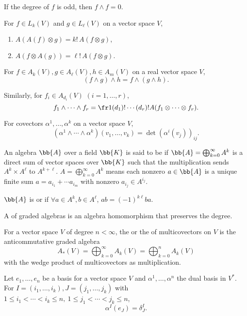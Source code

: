 If the degree of $f$ is odd, then $f \wedge f = 0$.

For $f \in L_k(V)$ and $g \in L_\ell(V)$ on a vector space $V$,
\begin{enumerate}
\item $A(A(f)\otimes g) = k!\,A(f\otimes g)$,
\item $A(f\otimes A(g)) = \ell!\,A(f\otimes g)$.
\end{enumerate}

For $f \in A_k(V), g \in A_\ell(V), h \in A_m(V)$ on a real vector space $V$,
\[
(f \wedge g) \wedge h = f \wedge ( g \wedge h).
\]

Similarly, for $f_i \in A_{d_i}(V)$ $(i = 1, \dotsc, r)$,
\[
f_1 \wedge \dotsb \wedge f_r = \fr1{(d_1)!\dotsm (d_r)!} A(f_1 \otimes \dotsm \otimes f_r).
\]

For covectors $\alpha^1, \dotsc , \alpha^k$ on a vector space $V$,
\[
(\alpha^1\wedge \dotsm \wedge \alpha^k)(v_1,\dotsc, v_k) = \det (\alpha^i (v_j))_{ij}.
\]

An algebra $\bb{A}$ over a field $\bb{K}$ is said to be  if $\bb{A} = \bigoplus_{k = 0}^\infty A^k$ is a direct sum of vector spaces over $\bb{K}$ such that the multiplication sends $A^k \times A^\ell$ to $A^{k+\ell}$. $A = \bigoplus_{k = 0}^\infty A^k$ means each nonzero $a \in \bb{A}$ is a unique finite sum $a = a_{i_1} + \dotsb a_{i_m}$ with nonzero $a_{i_j} \in A^{i_j}$.

$\bb{A}$ is  or  if $\forall a \in A^k, b \in A^\ell$, $ab = (-1)^{k\ell} ba$.

A  of graded algebras is an algebra homomorphism that preserves the degree.

For a vector space $V$ of degree $n < \infty$, the  or the  of multicovectors on $V$ is the anticommutative graded algebra
\[
A_* (V) = \bigoplus_{k = 0}^\infty A_k(V) = \bigoplus_{k = 0}^n A_k(V)
\]
with the wedge product of multicovectors as multiplication.

Let $e_1, \dotsc, e_n$ be a basis for a vector space $V$ and $\alpha^1, \dotsc, \alpha^n$ the dual basis in $V^*$. For $I = (i_1, \dotsc, i_k), J = (j_1, \dotsc, j_k)$ with $1 \le i_1 < \dotsb < i_k \le n,\ 1 \le j_1 < \dotsb < j_k \le n$,
\[
\alpha^I (e_J) = \delta^I_J.
\]

